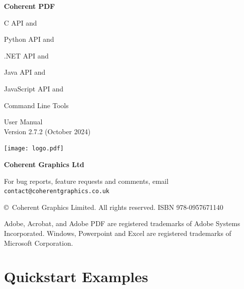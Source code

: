 \documentclass{book}
\newcommand{\smallgap}{\bigskip}
\begin{document}
\frontmatter
\pagestyle{empty}


\begin{flushright}


{\sffamily \bfseries \Huge Coherent PDF

\vspace{2mm}
\begin{cpdflib}
C API and 
\end{cpdflib}
\begin{pycpdflib}
Python API and
\end{pycpdflib}
\begin{dotnetcpdflib}
.NET API and
\end{dotnetcpdflib}
\begin{jcpdflib}
Java API and
\end{jcpdflib}
\begin{jscpdflib}
JavaScript API and
\end{jscpdflib}
Command Line Tools}

\vspace{12mm}

{\Huge User Manual}\\
Version 2.7.2 (October 2024)

\vspace{25mm}

\vfill
\ifdefined\HCode
\else
\texttt{[image: logo.pdf]}
\fi


\vspace{2mm}
{\sffamily \bfseries \LARGE Coherent Graphics Ltd}

\end{flushright}

\clearpage

\pagestyle{empty}
\noindent For bug reports, feature requests and comments, email\\ \texttt{contact@coherentgraphics.co.uk}

\vspace*{\fill}
\noindent\copyright\ Coherent Graphics Limited. All rights reserved. ISBN 978-0957671140

\smallgap 
\noindent Adobe, Acrobat, and Adobe PDF are
registered trademarks of Adobe Systems Incorporated. Windows, Powerpoint and
Excel are registered trademarks of Microsoft Corporation.

\cleardoublepage

\pagestyle{plain}
\chapter*{Quickstart Examples}
\end{document}
